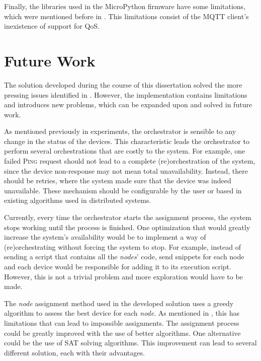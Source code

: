Finally, the libraries used in the MicroPython firmware have some limitations, which were mentioned before in . This limitations consist of the MQTT client's inexistence of support for QoS.

\section{Future Work}\label{sec:future_work}

The solution developed during the course of this dissertation solved the more pressing issues identified in . However, the implementation contains limitations and introduces new problems, which can be expanded upon and solved in future work.

As mentioned previously in  experiments, the orchestrator is sensible to any change in the status of the devices. This characteristic leads the orchestrator to perform several orchestrations that are costly to the system. For example, one failed \textsc{Ping} request should not lead to a complete (re)orchestration of the system, since the device non-response may not mean total unavailability. Instead, there should be retries, where the system made sure that the device was indeed unavailable. These mechanism should be configurable by the user or based in existing algorithms used in distributed systems.

Currently, every time the orchestrator starts the assignment process, the system stops working until the process is finished. One optimization that would greatly increase the system's availability would be to implement a way of (re)orchestrating without forcing the system to stop. For example, instead of sending a script that contains all the \textit{nodes}' code, send snippets for each node and each device would be responsible for adding it to its execution script. However, this is not a trivial problem and more exploration would have to be made.

The \textit{node} assignment method used in the developed solution uses a greedy algorithm to assess the best device for each \textit{node}. As mentioned in , this has limitations that can lead to impossible assignments. The assignment process could be greatly improved with the use of better algorithms. One alternative could be the use of SAT solving algorithms. This improvement can lead to several different solution, each with their advantages.

